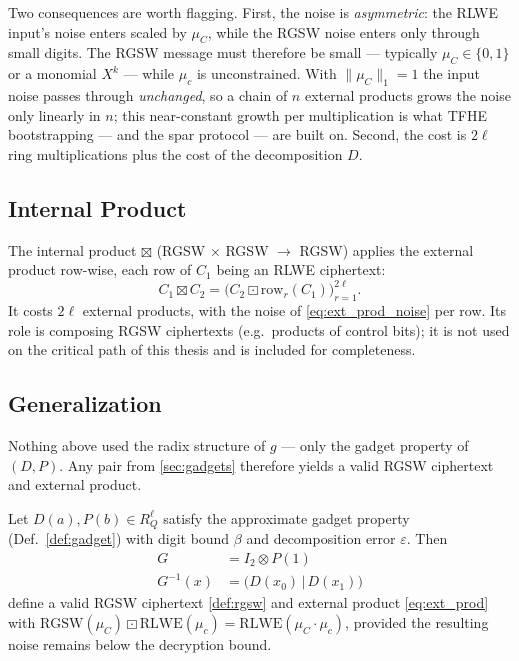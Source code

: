 Two consequences are worth flagging. First, the noise is \emph{asymmetric}: the RLWE input's noise enters scaled by $\mu_C$, while the RGSW noise enters only through small digits. The RGSW message must therefore be small --- typically $\mu_C \in \{0,1\}$ or a monomial $X^k$ --- while $\mu_c$ is unconstrained. With $\|\mu_C\|_1 = 1$ the input noise passes through \emph{unchanged}, so a chain of $n$ external products grows the noise only linearly in $n$; this near-constant growth per multiplication is what TFHE bootstrapping --- and the \gls{spar} protocol --- are built on.
Second, the cost is $2\ell$ ring multiplications plus the cost of the decomposition $D$.

\subsection{Internal Product}
The internal product $\boxtimes$ (RGSW $\times$ RGSW $\to$ RGSW) applies the external product row-wise, each row of $C_1$ being an RLWE ciphertext:
\begin{equation}
    C_1 \boxtimes C_2 = \big(C_2 \boxdot \mathrm{row}_r(C_1)\big)_{r=1}^{2\ell}.
\end{equation}
It costs $2\ell$ external products, with the noise of \eqref{eq:ext_prod_noise} per row. Its role is composing RGSW ciphertexts (e.g.\ products of control bits); it is not used on the critical path of this thesis and is included for completeness.

\subsection{Generalization}
Nothing above used the radix structure of $g$ --- only the gadget property of $(D, P)$. Any pair from \autoref{sec:gadgets} therefore yields a valid RGSW ciphertext and external product.

\begin{theorem}
    \label{thm:generalization}
    Let $D(a), P(b) \in R_Q^\ell$ satisfy the approximate gadget property
    (Def.~\ref{def:gadget}) with digit bound $\beta$ and decomposition error
    $\varepsilon$. Then
    \begin{align}
        G &= I_2 \otimes P(1) \label{eq:gen_G}\\
        G^{-1}(x) &= \big(D(x_0) \,\big|\, D(x_1)\big) \label{eq:gen_Ginv}
    \end{align}
    define a valid RGSW ciphertext \eqref{def:rgsw} and external product
    \eqref{eq:ext_prod} with
    $\mathrm{RGSW}(\mu_C) \boxdot \mathrm{RLWE}(\mu_c)
     = \mathrm{RLWE}(\mu_C \cdot \mu_c)$,
    provided the resulting noise remains below the decryption bound.
\end{theorem}

